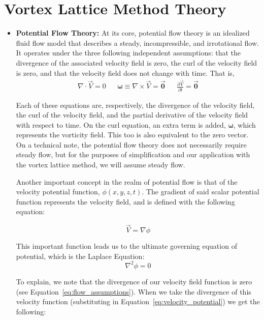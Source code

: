 \documentclass{report}
\begin{document}
\section{Vortex Lattice Method Theory}\label{sec:theory}
\begin{itemize}
\item[] \textbf{Potential Flow Theory:} At its core, potential flow theory is an idealized fluid flow model that describes a steady, incompressible, and irrotational flow. It operates under the three following independent assumptions: that the divergence of the associated velocity field is zero, the curl of the velocity field is zero, and that the velocity field does not change with time. That is,
\begin{align}\label{eq:flow_assumptions}
\nabla \cdot \vec{V} = 0 && \boldsymbol{\omega} \equiv \nabla \times \vec{V} = \boldsymbol{\vec{0}} && \frac{\partial \vec{V}}{\partial t} = \boldsymbol{\vec{0}}
\end{align} 

Each of these equations are, respectively, the divergence of the velocity field, the curl of the velocity field, and the partial derivative of the velocity field with respect to time. On the curl equation, an extra term is added, $\boldsymbol{\omega}$, which represents the vorticity field. This too is also equivalent to the zero vector. On a technical note, the potential flow theory does not necessarily require steady flow, but for the purposes of simplification and our application with the vortex lattice method, we will assume steady flow.

Another important concept in the realm of potential flow is that of the velocity potential function, $\phi(x,y,z,t)$. The gradient of said scalar potential function represents the velocity field, and is defined with the following equation:

\begin{equation}\label{eq:velocity_potential}
\vec{V} = \nabla \phi
\end{equation}

This important function leads us to the ultimate governing equation of potential, which is the Laplace Equation:
\begin{equation}\label{eq:laplace}
\nabla^2 \phi = 0
\end{equation}

To explain, we note that the divergence of our velocity field function is zero (see Equation~\ref{eq:flow_assumptions}). When we take the divergence of this velocity function (substituting in Equation~\ref{eq:velocity_potential}) we get the following:


\end{itemize}
\end{document}
